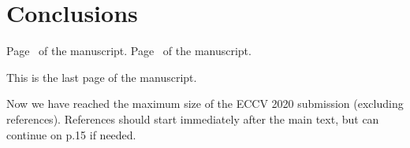 \documentclass[runningheads]{llncs}
\begin{document}




\section{Conclusions}



\clearpage\mbox{}Page \thepage\ of the manuscript.
\clearpage\mbox{}Page \thepage\ of the manuscript.

This is the last page of the manuscript.
\par\vfill\par
Now we have reached the maximum size of the ECCV 2020 submission (excluding references).
References should start immediately after the main text, but can continue on p.15 if needed.

\clearpage
%
%


\end{document}
